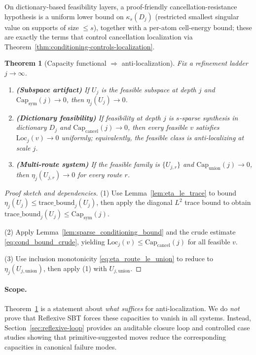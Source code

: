 \documentclass[11pt]{article}
\theoremstyle{plain}
\newtheorem{theorem}{Theorem}[section]
\theoremstyle{definition}
\theoremstyle{remark}
\begin{document}
On dictionary-based feasibility layers, a proof-friendly cancellation-resistance hypothesis is a uniform lower bound on \(\kappa_s(D_j)\) (restricted smallest singular value on supports of size \(\le s\)), together with a per-atom cell-energy bound; these are exactly the terms that control cancellation localization via Theorem~\ref{thm:conditioning-controls-localization}.

\begin{theorem}[Capacity functional \(\Rightarrow\) anti-localization]\label{thm:capacity_implies_AL}
Fix a refinement ladder \(j\to\infty\).

\begin{enumerate}
\item \textbf{(Subspace artifact)} If \(U_j\) is the feasible subspace at depth \(j\) and \(\mathrm{Cap}_{\mathrm{sym}}(j)\to 0\), then \(\eta_j(U_j)\to 0\).

\item \textbf{(Dictionary feasibility)} If feasibility at depth \(j\) is \(s\)-sparse synthesis in dictionary \(D_j\) and \(\mathrm{Cap}_{\mathrm{cancel}}(j)\to 0\), then every feasible \(v\) satisfies \(\mathrm{Loc}_j(v)\to 0\) uniformly; equivalently, the feasible class is anti-localizing at scale \(j\).

\item \textbf{(Multi-route system)} If the feasible family is \(\{U_{j,r}\}\) and \(\mathrm{Cap}_{\mathrm{union}}(j)\to 0\), then \(\eta_j(U_{j,r})\to 0\) for every route \(r\).
\end{enumerate}
\end{theorem}

\begin{proof}[Proof sketch and dependencies]
(1) Use Lemma~\ref{lem:eta_le_trace} to bound \(\eta_j(U_j)\le \mathrm{trace\_bound}_j(U_j)\), then apply the diagonal \(L^2\) trace bound to obtain \(\mathrm{trace\_bound}_j(U_j)\le \mathrm{Cap}_{\mathrm{sym}}(j)\).

(2) Apply Lemma~\ref{lem:sparse_conditioning_bound} and the crude estimate \eqref{eq:cond_bound_crude}, yielding \(\mathrm{Loc}_j(v)\le \mathrm{Cap}_{\mathrm{cancel}}(j)\) for all feasible \(v\).

(3) Use inclusion monotonicity \eqref{eq:eta_route_le_union} to reduce to \(\eta_j(U_{j,\mathrm{union}})\), then apply (1) with \(U_{j,\mathrm{union}}\).
\end{proof}

\paragraph{Scope.}
Theorem~\ref{thm:capacity_implies_AL} is a statement about \emph{what suffices} for anti-localization.
We do \emph{not} prove that Reflexive SBT forces these capacities to vanish in all systems.
Instead, Section~\ref{sec:reflexive-loop} provides an auditable closure loop and controlled case studies showing that primitive-suggested moves reduce the corresponding capacities in canonical failure modes.
\end{document}

